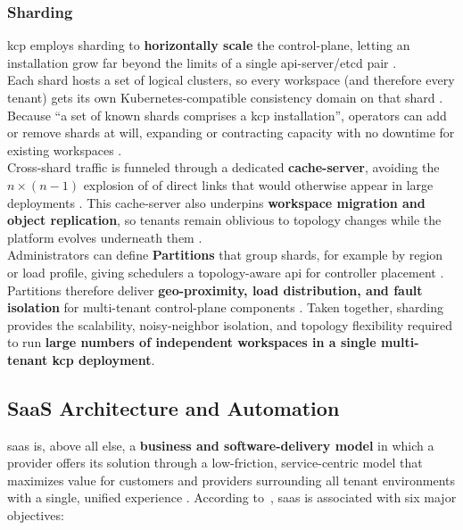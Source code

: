 \documentclass[11pt, a4paper, oneside, listof=totoc]{scrartcl}
\begin{document}
            \subsubsection{Sharding}\label{subsubsec:sharding}
                \gls{kcp} employs sharding to \textbf{horizontally scale} the control-plane, letting
                an installation grow far beyond the limits of a single \gls{api}-server/etcd
                pair \parencite{kcpSharding,kcpShardingShards}.
                \\
                Each shard hosts a set of logical clusters, so every workspace (and therefore every
                tenant) gets its own Kubernetes-compatible consistency domain on that shard
                \parencite{kcpShardingShards}.
                Because \enquote{a set of known shards comprises a \gls{kcp} installation},
                operators can add or remove shards at will, expanding or contracting capacity with
                no downtime for existing workspaces \parencite{kcpShardingShards}.
                \\
                Cross-shard traffic is funneled through a dedicated \textbf{cache-server}, avoiding
                the \( n \times (n - 1) \) explosion of of direct links that would otherwise appear
                in large deployments \parencite{kcpShardingCacheServer}.
                This cache-server also underpins \textbf{workspace migration and object
                replication}, so tenants remain oblivious to topology changes while the platform
                evolves underneath them \parencite{kcpShardingCacheServer}.
                \\
                Administrators can define \textbf{Partitions} that group shards, for example by
                region or load profile, giving schedulers a topology-aware \gls{api} for controller
                placement \parencite{kcpShardingPartitions}.
                Partitions therefore deliver \textbf{geo-proximity, load distribution, and fault
                isolation} for multi-tenant control-plane components
                \parencite{kcpShardingPartitions}.
                Taken together, sharding provides the scalability, noisy-neighbor isolation, and
                topology flexibility required to run \textbf{large numbers of independent workspaces
                in a single multi-tenant \gls{kcp} deployment}.
        \newpage

        \subsection{SaaS Architecture and Automation}\label{subsec:saas}
            \gls{saas} is, above all else, a \textbf{business and software-delivery model} in which
            a provider offers its solution through a low-friction, service-centric model that
            maximizes value for customers and providers surrounding all tenant environments with a
            single, unified experience
            \parencites[pp.~3--4]{awsSaaSArchitectureFundamentals}[p.~11]{awsSaaSArchitectureFundamentals}.
            According to~\cite[pp.~3-4]{awsSaaSArchitectureFundamentals}, \gls{saas} is associated
            with six major objectives:
\end{document}
